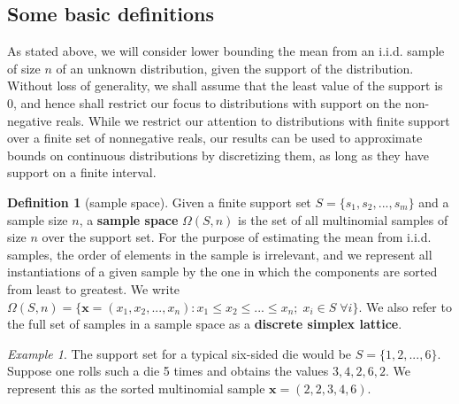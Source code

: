 \documentclass{article}
\theoremstyle{definition}
\newtheorem{definition}{Definition}[section]
\theoremstyle{remark}
\newtheorem{example}{Example}[section]
\def\x{\mathbf{x}}
\begin{document}
\subsection{Some basic definitions}
As stated above, we will consider lower bounding the mean from an i.i.d. sample of size $n$ of an unknown distribution, given the support of the distribution. Without loss of generality, we shall assume that the least value of the support is $0$, and hence shall restrict our focus to distributions with support on the non-negative reals.  While we restrict our attention to distributions with finite support over a finite set of nonnegative reals, our results can be used to approximate bounds on continuous distributions by discretizing them, as long as they have support on a finite interval.

\begin{definition}[sample space]
Given a finite support set $S=\{s_1,s_2,...,s_m\}$ and a sample size $n$, a {\bf sample space} $\Omega(S,n)$ is the set of all multinomial samples of size $n$ over the support set. For the purpose of estimating the mean from i.i.d. samples, the order of elements in the sample is irrelevant, and we represent all instantiations of a given sample by the one in which the components are sorted from least to greatest. We write $\Omega(S,n)=\{\x=(x_1,x_2,...,x_n): x_1\leq x_2 \leq ... \leq x_n; \; x_i\in S \;\forall i\}.$  We also refer to the full set of samples in a sample space as a {\bf discrete simplex lattice}. 
\end{definition}

\begin{example}
    The support set for a typical six-sided die 
    would be $S=\{1,2,...,6\}$. Suppose one rolls such a die 5 times and obtains the values $3,4,2,6,2$. We represent this as the sorted multinomial sample $\x=(2,2,3,4,6).$
\end{example}
\end{document}
